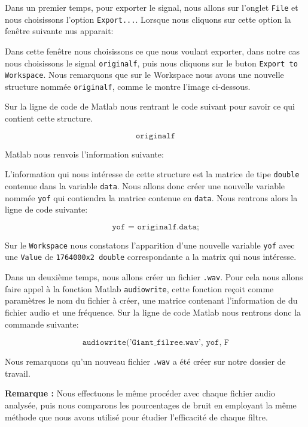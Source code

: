 \documentclass[conference,onecolumn]{IEEEtran}
\begin{document}
Dans un premier temps, pour exporter le signal, nous allons sur l'onglet \texttt{File} et nous choisissons l'option \texttt{Export...}. Lorsque nous cliquons sur cette option la fenêtre suivante nus apparait:


Dans cette fenêtre nous choisissons ce que nous voulant exporter, dans notre cas nous choisissons le signal \texttt{originalf}, puis nous cliquons sur le buton \texttt{Export to Workspace}. Nous remarquons que sur le Workspace nous avons une nouvelle structure nommée \texttt{originalf}, comme le montre l'image ci-dessous.


Sur la ligne de code de Matlab nous rentrant le code suivant pour savoir ce qui contient cette structure.

\[\texttt{originalf}\]

Matlab nous renvois l'information suivante:


L'information qui nous intéresse de cette structure est la matrice de tipe \texttt{double} contenue dans la variable \texttt{data}. Nous allons donc créer une nouvelle variable nommée \texttt{yof} qui contiendra la matrice contenue en \texttt{data}. Nous rentrons alors la ligne de code suivante:

\[\texttt{yof = originalf.data;}\]

Sur le \texttt{Workspace} nous constatons l'apparition d'une nouvelle variable \texttt{yof} avec une \texttt{Value} de \texttt{1764000x2 double} correspondante a la matrix qui nous intéresse.

Dans un deuxième temps, nous allons créer un fichier \texttt{.wav}. Pour cela nous allons faire appel à la fonction Matlab \texttt{audiowrite}, cette fonction reçoit comme paramètres le nom du fichier à créer, une matrice contenant l'information de du fichier audio et une fréquence. Sur la ligne de code Matlab nous rentrons donc la commande suivante:

\[\texttt{audiowrite('Giant_filree.wav', yof, F}\]

Nous remarquons qu'un nouveau fichier \texttt{.wav} a été créer sur notre dossier de travail. 

\item \textbf{Remarque :} Nous effectuons le même procéder avec chaque fichier audio analysée, puis nous comparons les pourcentages de bruit en employant la même méthode que nous avons utilisé pour étudier l'efficacité de chaque filtre. 
\end{document}
